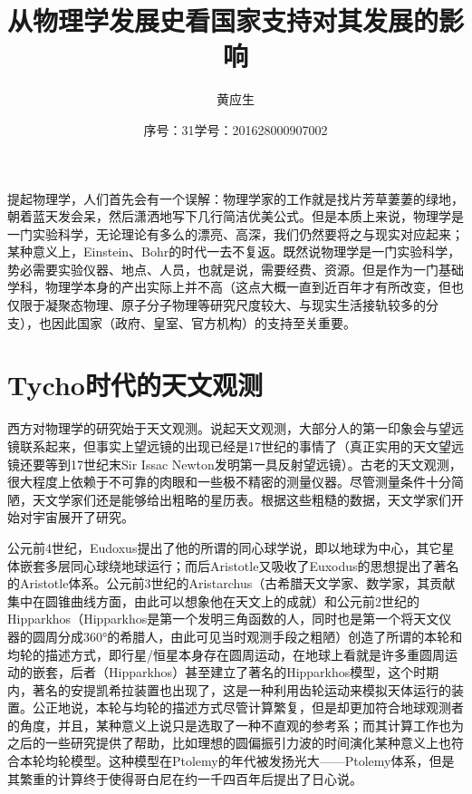 \documentclass{article}
\title{从物理学发展史看国家支持对其发展的影响}
\author{黄应生}
\date{序号：31\qquad 学号：201628000907002}
\begin{document}
\maketitle
提起物理学，人们首先会有一个误解：物理学家的工作就是找片芳草萋萋的绿地，朝着蓝天发会呆，然后潇洒地写下几行简洁优美公式。但是本质上来说，物理学是一门实验科学，无论理论有多么的漂亮、高深，我们仍然要将之与现实对应起来；某种意义上，Einstein、Bohr的时代一去不复返。既然说物理学是一门实验科学，势必需要实验仪器、地点、人员，也就是说，需要经费、资源。但是作为一门基础学科，物理学本身的产出实际上并不高（这点大概一直到近百年才有所改变，但也仅限于凝聚态物理、原子分子物理等研究尺度较大、与现实生活接轨较多的分支），也因此国家（政府、皇室、官方机构）的支持至关重要。

\section{Tycho时代的天文观测}

西方对物理学的研究始于天文观测。说起天文观测，大部分人的第一印象会与望远镜联系起来，但事实上望远镜的出现已经是17世纪的事情了（真正实用的天文望远镜还要等到17世纪末Sir Issac Newton发明第一具反射望远镜）。古老的天文观测，很大程度上依赖于不可靠的肉眼和一些极不精密的测量仪器。尽管测量条件十分简陋，天文学家们还是能够给出粗略的星历表。根据这些粗糙的数据，天文学家们开始对宇宙展开了研究。

公元前4世纪，Eudoxus提出了他的所谓的同心球学说，即以地球为中心，其它星体嵌套多层同心球绕地球运行；而后Aristotle又吸收了Euxodus的思想提出了著名的Aristotle体系。公元前3世纪的Aristarchus（古希腊天文学家、数学家，其贡献集中在圆锥曲线方面，由此可以想象他在天文上的成就）和公元前2世纪的Hipparkhos（Hipparkhos是第一个发明三角函数的人，同时也是第一个将天文仪器的圆周分成360°的希腊人，由此可见当时观测手段之粗陋）创造了所谓的本轮和均轮的描述方式，即行星/恒星本身存在圆周运动，在地球上看就是许多重圆周运动的嵌套，后者（Hipparkhos）甚至建立了著名的Hipparkhos模型，这个时期内，著名的安提凯希拉装置也出现了，这是一种利用齿轮运动来模拟天体运行的装置。公正地说，本轮与均轮的描述方式尽管计算繁复，但是却更加符合地球观测者的角度，并且，某种意义上说只是选取了一种不直观的参考系；而其计算工作也为之后的一些研究提供了帮助，比如理想的圆偏振引力波的时间演化某种意义上也符合本轮均轮模型。这种模型在Ptolemy的年代被发扬光大——Ptolemy体系，但是其繁重的计算终于使得哥白尼在约一千四百年后提出了日心说。
\end{document}
